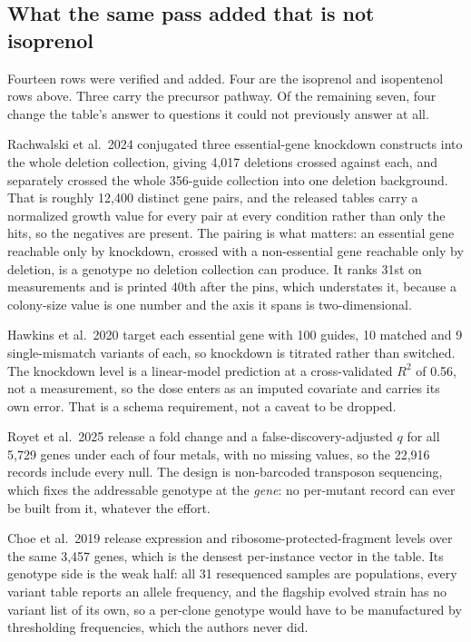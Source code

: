 \subsection{What the same pass added that is not isoprenol}

Fourteen rows were verified and added. Four are the isoprenol and isopentenol rows above.
Three carry the precursor pathway. Of the remaining seven, four change the table's answer
to questions it could not previously answer at all.

 Rachwalski et al.\ 2024
conjugated three essential-gene knockdown constructs into the whole deletion collection,
giving 4,017 deletions crossed against each, and separately crossed the whole 356-guide
collection into one deletion background. That is roughly 12,400 distinct gene pairs, and
the released tables carry a normalized growth value for every pair at every condition
rather than only the hits, so the negatives are present. The pairing is what matters: an
essential gene reachable only by knockdown, crossed with a non-essential gene reachable
only by deletion, is a genotype no deletion collection can produce. It ranks 31st on
measurements and is printed 40th after the pins, which understates it, because a colony-size value is one number and the
axis it spans is two-dimensional.

 Hawkins et al.\ 2020 target each essential gene with
100 guides, 10 matched and 9 single-mismatch variants of each, so knockdown is titrated
rather than switched. The knockdown level is a linear-model prediction at a cross-validated
$R^{2}$ of 0.56, not a measurement, so the dose enters as an imputed covariate and carries
its own error. That is a schema requirement, not a caveat to be dropped.

 Royet et al.\ 2025 release a
fold change and a false-discovery-adjusted $q$ for all 5,729  genes under
each of four metals, with no missing values, so the 22,916 records include every null. The
design is non-barcoded transposon sequencing, which fixes the addressable genotype at the
\emph{gene}: no per-mutant record can ever be built from it, whatever the effort.

 Choe et al.\ 2019 release expression and
ribosome-protected-fragment levels over the same 3,457 genes, which is the densest
per-instance vector in the table. Its genotype side is the weak half: all 31 resequenced
samples are populations, every variant table reports an allele frequency, and the flagship
evolved strain has no variant list of its own, so a per-clone genotype would have to be
manufactured by thresholding frequencies, which the authors never did.

